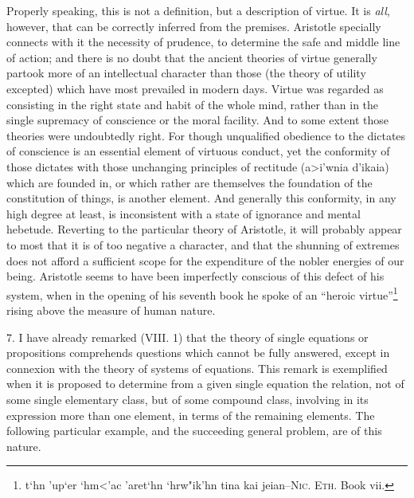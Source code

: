 \documentclass[oneside]{book}
\begin{document}
Properly speaking, this is not a definition, but a description
of virtue. It is \textit{all}, however, that can be correctly inferred from
the premises. Aristotle specially connects with it the necessity
of prudence, to determine the safe and middle line of action; and
there is no doubt that the ancient theories of virtue generally
partook more of an intellectual character than those (the theory
of utility excepted) which have most prevailed in modern days.
Virtue was regarded as consisting in the right state and habit of
the whole mind, rather than in the single supremacy of conscience
or the moral facility. And to some extent those theories
were undoubtedly right. For though unqualified obedience to
the dictates of conscience is an essential element of virtuous conduct,
yet the conformity of those dictates with those unchanging
principles of rectitude (\textgreek{a>i'wnia d'ikaia})%
which are founded in, or
which rather are themselves the foundation of the constitution of
things, is another element. And generally this conformity, in
any high degree at least, is inconsistent with a state of ignorance
and mental hebetude. Reverting to the particular theory of
Aristotle, it will probably appear to most that it is of too negative
a character, and that the shunning of extremes does not
afford a sufficient scope for the expenditure of the nobler energies
of our being. Aristotle seems to have been imperfectly conscious
of this defect of his system, when in the opening of his seventh
book he spoke of an ``heroic virtue''\footnote{\textgreek{t`hn 'up`er
`hm<'ac 'aret`hn `hrw"ik'hn tina kai jeian}--\textsc{Nic. Eth.} Book vii.}
rising above the measure
of human nature.

7. I have already remarked (VIII. 1) that the theory of single
equations or propositions comprehends questions which cannot
be fully answered, except in connexion with the theory of
systems of equations. This remark is exemplified when it is
proposed to determine from a given single equation the relation,
not of some single elementary class, but of some compound class,
involving in its expression more than one element, in terms of
the remaining elements. The following particular example, and
the succeeding general problem, are of this nature.
\end{document}
